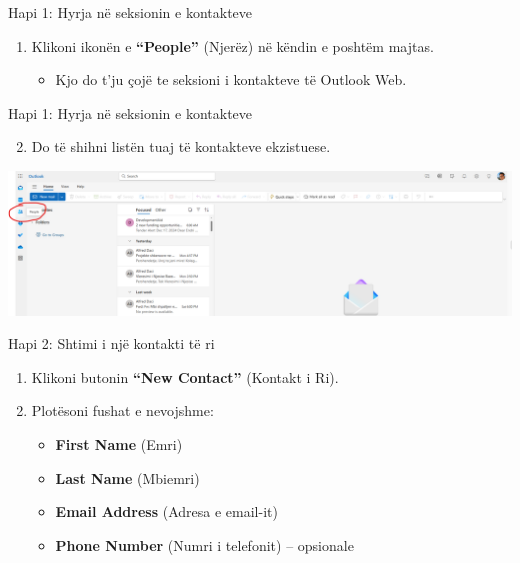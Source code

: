 \documentclass[
  ignorenonframetext,
]{beamer}
\providecommand{\tightlist}{%
  \setlength{\itemsep}{0pt}\setlength{\parskip}{0pt}}
\begin{document}
\begin{frame}{Hapi 1: Hyrja në seksionin e kontakteve}
\label{hapi-1-hyrja-nuxeb-seksionin-e-kontakteve}
\begin{enumerate}
\item
  Klikoni ikonën e \textbf{``People''} (Njerëz) në këndin e poshtëm
  majtas.

  \begin{itemize}
  \tightlist
  \item
    Kjo do t'ju çojë te seksioni i kontakteve të Outlook Web.
  \end{itemize}
\end{enumerate}
\end{frame}

\begin{frame}{Hapi 1: Hyrja në seksionin e kontakteve}
\label{hapi-1-hyrja-nuxeb-seksionin-e-kontakteve-1}
\begin{enumerate}
\setcounter{enumi}{1}
\tightlist
\item
  Do të shihni listën tuaj të kontakteve ekzistuese.
\end{enumerate}

\includegraphics{./images/outlook22.png}
\end{frame}

\begin{frame}{Hapi 2: Shtimi i një kontakti të ri}
\label{hapi-2-shtimi-i-njuxeb-kontakti-tuxeb-ri}
\begin{enumerate}
\item
  Klikoni butonin \textbf{``New Contact''} (Kontakt i Ri).
\item
  Plotësoni fushat e nevojshme:

  \begin{itemize}
  \item
    \textbf{First Name} (Emri)
  \item
    \textbf{Last Name} (Mbiemri)
  \item
    \textbf{Email Address} (Adresa e email-it)
  \item
    \textbf{Phone Number} (Numri i telefonit) -- opsionale
  \end{itemize}
\end{enumerate}
\end{frame}
\end{document}

